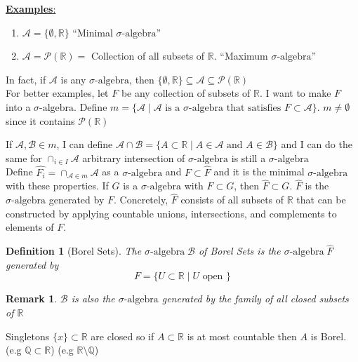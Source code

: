 \documentclass[11pt]{article}
\newtheorem{definition}{Definition}[section]
\newtheorem*{remark}{Remark}
\newcommand{\siga}{\sigma\text{-algebra}}
\begin{document}
    \underline{\textbf{Examples}:}

    \begin{enumerate}
        \item $\mathcal{A} = \{ \emptyset, \mathbb{R} \}$ ``Minimal $\siga$''
        \item $\mathcal{A} = \mathcal{P}(\mathbb{R}) = $ Collection of all subsets of $\mathbb{R}$.
        ``Maximum $\siga$''
    \end{enumerate}

    In fact, if $\mathcal{A}$ is any $\siga$, then $\{ \emptyset,\mathbb{R} \} \subseteq \mathcal{A} \subseteq \mathcal{P}(\mathbb{R})$\\

    For better examples, let $F$ be any collection of subsets of $\mathbb{R}$.
    I want to make $F$ into a $\siga$.
    Define $m = \{ \mathcal{A} \mid \mathcal{A} \text{ is a } \siga \text{ that satisfies } F \subset \mathcal{A} \}$.
    $m \neq \emptyset$ since it contains $\mathcal{P}(\mathbb{R})$

    If $\mathcal{A}, \mathcal{B} \in m$, I can define $\mathcal{A} \cap \mathcal{B} = \{ A \subset \mathbb{R} \mid A \in \mathcal{A} \text{ and } A \in \mathcal{B} \}$ and I can do the same for $\cap_{i \in I} \mathcal{A}$ arbitrary intersection of $\siga$ is still a $\siga$\\

    Define $\hat{F_i} = \cap_{\mathcal{A} \in m} \mathcal{A}$ as a $\siga$ and $F \subset \hat{F}$ and it is the minimal $\siga$ with these properties.
    If $G$ is a $\siga$ with $F \subset G$, then $\hat{F} \subset G$.
    $\hat{F}$ is the $\siga$ generated by $F$.
    Concretely, $\hat{F}$ consists of all subsets of $\mathbb{R}$ that can be constructed by applying countable unions, intersections, and complements to elements of $F$.

    \begin{definition}[Borel Sets]
        The $\siga \; \mathcal{B}$ of Borel Sets is the $\siga \; \hat{F}$ generated by
        \[
            F = \{ U \subset \mathbb{R} \mid U \text{ open } \}
        \]
    \end{definition}

    \begin{remark}
        $\mathcal{B}$ is also the $\siga$ generated by the family of all closed subsets of $\mathbb{R}$
    \end{remark}

    Singletons $\{ x \} \subset \mathbb{R}$ are closed so if $A \subset \mathbb{R}$ is at most countable then $A$ is Borel.
    (e.g $\mathbb{Q} \subset \mathbb{R}$) (e.g $\mathbb{R} \setminus \mathbb{Q}$)
\end{document}
